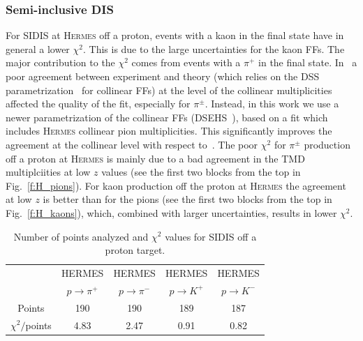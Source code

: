 \documentclass[aps,preprintnumbers,showpacs,nofootinbib,superscriptaddress,floatfix]{revtex4}
\newcommand{\hermes}{\textsc{Hermes }}
\begin{document}
\subsubsection*{Semi-inclusive DIS}
\label{sss:SIDIS_agreement}


For SIDIS at \hermes off a proton, events with a kaon in the final state have in general a lower $\chi^2$. This is due to the large uncertainties for the kaon FFs. 
The major contribution to the $\chi^2$ comes from events with a $\pi^+$ in the final state. 
In~\cite{Signori:2013mda,Signori:2013gra} a poor agreement between experiment and theory (which relies on the DSS parametrization~\cite{deFlorian:2007aj} for collinear FFs) at the level of the collinear multiplicities affected the quality of the fit, especially for $\pi^\pm$. Instead, in this work we use a newer parametrization of the collinear FFs (DSEHS~\cite{deFlorian:2014xna}), based on a fit which includes \hermes collinear pion multiplicities. This significantly improves the agreement at the collinear level with respect to~\cite{Signori:2013mda,Signori:2013gra}. 
The poor $\chi^2$ for $\pi^\pm$ production off a proton at \hermes is mainly due to a bad agreement in the TMD multiplciities at low $z$ values (see the first two blocks from the top in Fig.~\ref{f:H_pions}). 
For kaon production off the proton at \hermes the agreement at low $z$ is better than for the pions (see the first two blocks from the top in Fig.~\ref{f:H_kaons}), which, combined with larger uncertainties, results in lower $\chi^2$.
\begin{table}[h!]
\begin{center}
\begin{tabular}{|c|c|c|c|c|}
 \hline
\hline
  & HERMES & HERMES & HERMES & HERMES \\   
 &  $p \to \pi^+$    &   $p \to \pi^-$    &  $p \to K^+$    &   $p \to K^-$
 \\
 \hline
 Points         &  190 & 190 & 189 & 187       \\
 \hline
$\chi^2 /$points &4.83 & 2.47 & 0.91 & 0.82   \\            
\hline
\hline
\end{tabular}
\caption{Number of points analyzed and $\chi^2$ values for SIDIS off a proton target.}
\label{t:fl_ind_chi2_eP}
\end{center}
\end{table}
\end{document}
